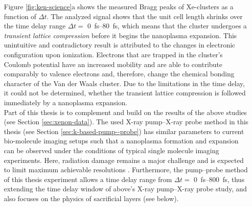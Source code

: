 Figure \ref{fig:ken-science}a shows the measured Bragg peaks of Xe-clusters as a function of $\Delta t$. The analyzed signal shows that the unit cell length shrinks over the time delay range $\Delta t =$ \SIrange{0}{80}{\femto\second}, which means that the cluster undergoes a \textit{transient lattice compression} before it begins the nanoplasma expansion. This unintuitive and contradictory result is attributed to the changes in electronic configuration upon ionization. Electrons that are trapped in the cluster's Coulomb potential have an increased mobility and are able to contribute comparably to valence electrons and, therefore, change the chemical bonding character of the Van der Waals cluster. Due to the limitations in the time delay, it could not be determined, whether the transient lattice compression is followed immediately by a nanoplasma expansion.\\[1\baselineskip]
Part of this thesis is to complement and build on the results of the above studies (see Section \ref{sec:xenon-data}). The used X-ray pump--X-ray probe method in this thesis (see Section \ref{sec:k-based-pump--probe}) has similar parameters to current bio-molecule imaging setups such that a nanoplasma formation and expansion can be observed under the conditions of typical single molecule imaging experiments. Here, radiation damage remains a major challenge and is expected to limit maximum achievable resolutions \cite{Aquila-2015-StrucDyn}. Furthermore, the pump--probe method of this thesis experiment allows a time delay range from $\Delta t=$ \SIrange{0}{800}{\femto\second}, thus extending the time delay window of above's X-ray pump--X-ray probe study, and also focuses on the physics of sacrificial layers (see below).
%
%
%

